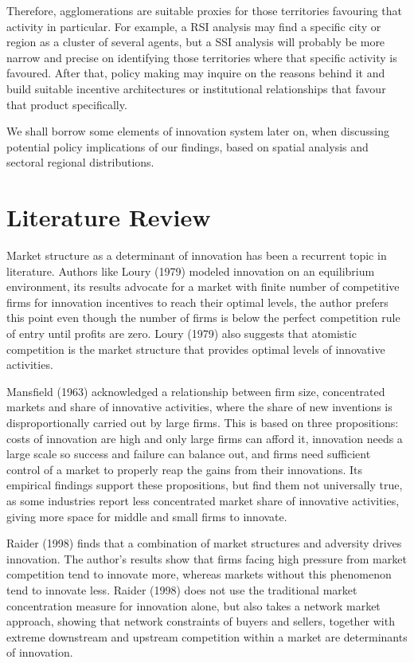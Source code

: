 \documentclass[12pt,a4paper]{article}
\begin{document}
Therefore, agglomerations are suitable proxies for those territories favouring that activity in particular. For example, a RSI analysis may find a specific city or region as a cluster of several agents, but a SSI analysis will probably be more narrow and precise on identifying those territories where that specific activity is favoured. After that, policy making may inquire on the reasons behind it and build suitable incentive architectures or institutional relationships that favour that product specifically.

We shall borrow some elements of innovation system later on, when discussing potential policy implications of our findings, based on spatial analysis and sectoral regional distributions.

\section{Literature Review}

Market structure as a determinant of innovation has been a recurrent topic in literature. Authors like Loury (1979) modeled innovation on an equilibrium environment, its results advocate for a market with finite number of competitive firms for innovation incentives to reach their optimal levels, the author prefers this point even though the number of firms is below the perfect competition rule of entry until profits are zero. Loury (1979) also suggests that atomistic competition is the market structure that provides optimal levels of innovative activities. 

Mansfield (1963) acknowledged a relationship between firm size, concentrated markets and share of innovative activities, where the share of new inventions is disproportionally carried out by large firms. This is based on three propositions: costs of innovation are high and only large firms can afford it, innovation needs a large scale so success and failure can balance out, and firms need sufficient control of a market to properly reap the gains from their innovations. Its empirical findings support these propositions, but find them not universally true, as some industries report less concentrated market share of innovative activities, giving more space for middle and small firms to innovate. 

Raider (1998) finds that a combination of market structures and adversity drives innovation. The author’s results show that firms facing high pressure from market competition tend to innovate more, whereas markets without this phenomenon tend to innovate less. Raider (1998) does not use the traditional market concentration measure for innovation alone, but also takes a network market approach, showing that network constraints of buyers and sellers, together with extreme downstream and upstream competition within a market are determinants of innovation. 
\end{document}
